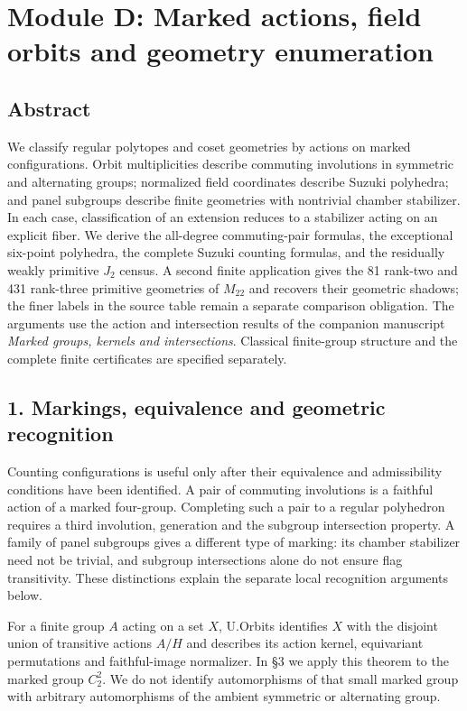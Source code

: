 \documentclass[
  11pt,
  a4paper,
]{article}
\author{}
\date{}
\begin{document}
\section{Module D: Marked actions, field orbits and geometry
enumeration}\label{module-d-marked-actions-field-orbits-and-geometry-enumeration}

\subsection{Abstract}\label{abstract}

We classify regular polytopes and coset geometries by actions on marked
configurations. Orbit multiplicities describe commuting involutions in
symmetric and alternating groups; normalized field coordinates describe
Suzuki polyhedra; and panel subgroups describe finite geometries with
nontrivial chamber stabilizer. In each case, classification of an
extension reduces to a stabilizer acting on an explicit fiber. We derive
the all-degree commuting-pair formulas, the exceptional six-point
polyhedra, the complete Suzuki counting formulas, and the residually
weakly primitive \(J_2\) census. A second finite application gives the
81 rank-two and 431 rank-three primitive geometries of \(M_{22}\) and
recovers their geometric shadows; the finer labels in the source table
remain a separate comparison obligation. The arguments use the action
and intersection results of the companion manuscript \emph{Marked
groups, kernels and intersections}. Classical finite-group structure and
the complete finite certificates are specified separately.

\subsection{1. Markings, equivalence and geometric
recognition}\label{markings-equivalence-and-geometric-recognition}

Counting configurations is useful only after their equivalence and
admissibility conditions have been identified. A pair of commuting
involutions is a faithful action of a marked four-group. Completing such
a pair to a regular polyhedron requires a third involution, generation
and the subgroup intersection property. A family of panel subgroups
gives a different type of marking: its chamber stabilizer need not be
trivial, and subgroup intersections alone do not ensure flag
transitivity. These distinctions explain the separate local recognition
arguments below.

For a finite group \(A\) acting on a set \(X\), U.Orbits identifies
\(X\) with the disjoint union of transitive actions \(A/H\) and
describes its action kernel, equivariant permutations and faithful-image
normalizer. In §3 we apply this theorem to the marked group \(C_2^2\).
We do not identify automorphisms of that small marked group with
arbitrary automorphisms of the ambient symmetric or alternating group.
\end{document}
